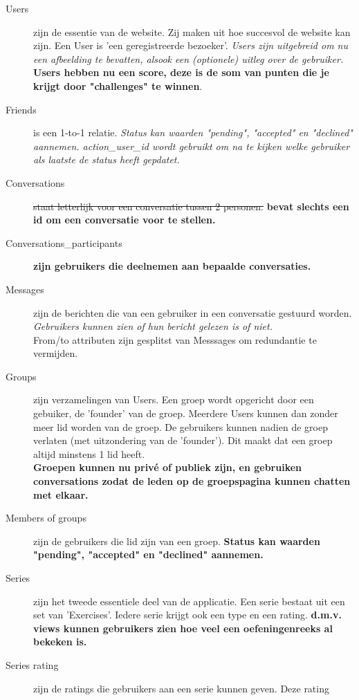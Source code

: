 \begin{description}
    \item[Users] zijn de essentie van de website. Zij maken uit hoe succesvol de website kan zijn.
        Een User is 'een geregistreerde bezoeker'. \textsl{Users zijn uitgebreid om nu een afbeelding
        te bevatten, alsook een (optionele) uitleg over de gebruiker.} \textbf{Users hebben nu een score,
        deze is de som van punten die je krijgt door "challenges" te winnen}.
    \item[Friends] is een 1-to-1 relatie. \textsl{Status kan waarden "pending", "accepted" en "declined" aannemen.
        action\_user\_id wordt gebruikt om na te kijken welke gebruiker als laatste de status heeft gepdatet.}
    \item[Conversations] \st{staat letterlijk voor een conversatie tussen 2 personen.} \textbf{bevat slechts een id
        om een conversatie voor te stellen.}
    \item[Conversations\_participants] \textbf{zijn gebruikers die deelnemen aan bepaalde conversaties.}
    \item[Messages] zijn de berichten die van een gebruiker in een conversatie gestuurd worden.
        \textsl{Gebruikers kunnen zien of hun bericht gelezen is of niet.} \\
        From/to attributen zijn gesplitst van Messsages om redundantie te vermijden.
    \item[Groups] zijn verzamelingen van Users. Een groep wordt opgericht door een gebuiker, de 'founder'
        van de groep. Meerdere Users kunnen dan zonder meer lid worden van de groep. De gebruikers kunnen
        nadien de groep verlaten (met uitzondering van de 'founder'). Dit maakt dat een groep altijd minstens
        1 lid heeft.
        \\\textbf{Groepen kunnen nu priv\'e of publiek zijn, en gebruiken conversations zodat de
        leden op de groepspagina kunnen chatten met elkaar.}
    \item[Members of groups] zijn de gebruikers die lid zijn van een groep. \textbf{Status kan waarden "pending",
        "accepted" en "declined" aannemen.}
    \item[Series] zijn het tweede essentiele deel van de applicatie. Een serie bestaat uit een set
        van 'Exercises'. Iedere serie krijgt ook een type en een rating.
        \textbf{d.m.v. views kunnen gebruikers zien hoe veel een oefeningenreeks al bekeken is.}
    \item[Series rating] zijn de ratings die gebruikers aan een serie kunnen geven. Deze rating

\end{description}
